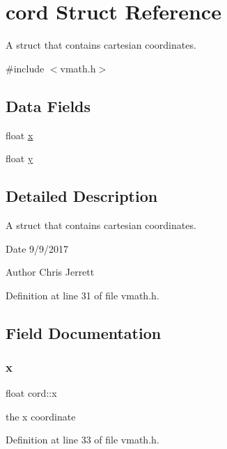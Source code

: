 \hypertarget{structcord}{}\section{cord Struct Reference}
\label{structcord}


A struct that contains cartesian coordinates.  




{\ttfamily \#include $<$vmath.\+h$>$}

\subsection*{Data Fields}
\begin{DoxyCompactItemize}
\item 
float \hyperlink{structcord_a2eef9b681474b679cf87b0c20eced2cd}{x}
\item 
float \hyperlink{structcord_a4e7d289c55cfe511532e53a81dc19215}{y}
\end{DoxyCompactItemize}


\subsection{Detailed Description}
A struct that contains cartesian coordinates. 

\begin{DoxyDate}{Date}
9/9/2017 
\end{DoxyDate}
\begin{DoxyAuthor}{Author}
Chris Jerrett 
\end{DoxyAuthor}


Definition at line 31 of file vmath.\+h.



\subsection{Field Documentation}
\mbox{\label{structcord_a2eef9b681474b679cf87b0c20eced2cd}} 
\subsubsection{\texorpdfstring{x}{x}}
{\footnotesize\ttfamily float cord\+::x}

the x coordinate 

Definition at line 33 of file vmath.\+h.



